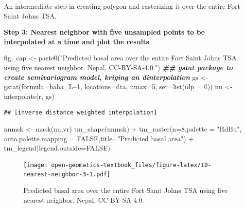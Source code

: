 \documentclass[
]{book}
\newenvironment{Shaded}{\begin{snugshade}}{\end{snugshade}}
\newcommand{\AttributeTok}[1]{\textcolor[rgb]{0.77,0.63,0.00}{#1}}
\newcommand{\ConstantTok}[1]{\textcolor[rgb]{0.00,0.00,0.00}{#1}}
\newcommand{\DecValTok}[1]{\textcolor[rgb]{0.00,0.00,0.81}{#1}}
\newcommand{\DocumentationTok}[1]{\textcolor[rgb]{0.56,0.35,0.01}{\textbf{\textit{#1}}}}
\newcommand{\FunctionTok}[1]{\textcolor[rgb]{0.00,0.00,0.00}{#1}}
\newcommand{\NormalTok}[1]{#1}
\newcommand{\OtherTok}[1]{\textcolor[rgb]{0.56,0.35,0.01}{#1}}
\newcommand{\SpecialCharTok}[1]{\textcolor[rgb]{0.00,0.00,0.00}{#1}}
\newcommand{\StringTok}[1]{\textcolor[rgb]{0.31,0.60,0.02}{#1}}
\begin{document}
An intermediate step in creating polygon and rasterizing it over the entire Fort Saint Johns TSA.

\textbf{Step 3: Nearest neighbor with five unsampled points to be interpolated at a time and plot the results}

\begin{Shaded}
\begin{Highlighting}[]
\NormalTok{fig\_cap }\OtherTok{\textless{}{-}} \FunctionTok{paste0}\NormalTok{(}\StringTok{"Predicted basal area over the entire Fort Saint Johns TSA using five nearest neighbor. Nepal, CC{-}BY{-}SA{-}4.0."}\NormalTok{)}
\DocumentationTok{\#\# gstat package to create semivariogram model, kriging an dinterpolation}
\NormalTok{gs }\OtherTok{\textless{}{-}} \FunctionTok{gstat}\NormalTok{(}\AttributeTok{formula=}\NormalTok{baha\_L}\SpecialCharTok{\textasciitilde{}}\DecValTok{1}\NormalTok{, }\AttributeTok{locations=}\NormalTok{dta, }\AttributeTok{nmax=}\DecValTok{5}\NormalTok{, }\AttributeTok{set=}\FunctionTok{list}\NormalTok{(}\AttributeTok{idp =} \DecValTok{0}\NormalTok{))}
\NormalTok{nn }\OtherTok{\textless{}{-}} \FunctionTok{interpolate}\NormalTok{(r, gs)}
\end{Highlighting}
\end{Shaded}

\begin{verbatim}
## [inverse distance weighted interpolation]
\end{verbatim}

\begin{Shaded}
\begin{Highlighting}[]
\NormalTok{nnmsk }\OtherTok{\textless{}{-}} \FunctionTok{mask}\NormalTok{(nn,vr)}
\FunctionTok{tm\_shape}\NormalTok{(nnmsk) }\SpecialCharTok{+}
  \FunctionTok{tm\_raster}\NormalTok{(}\AttributeTok{n=}\DecValTok{8}\NormalTok{,}\AttributeTok{palette =} \StringTok{"RdBu"}\NormalTok{, }\AttributeTok{auto.palette.mapping =} \ConstantTok{FALSE}\NormalTok{,}\AttributeTok{title=}\StringTok{"Predicted basal area"}\NormalTok{) }\SpecialCharTok{+}
  \FunctionTok{tm\_legend}\NormalTok{(}\AttributeTok{legend.outside=}\ConstantTok{FALSE}\NormalTok{)}
\end{Highlighting}
\end{Shaded}

\begin{figure}
\centering
\texttt{[image: open-geomatics-textbook\_files/figure-latex/10-nearest-neighbor-3-1.pdf]}
\caption{\label{fig:10-nearest-neighbor-3}Predicted basal area over the entire Fort Saint Johns TSA using five nearest neighbor. Nepal, CC-BY-SA-4.0.}
\end{figure}
\end{document}
